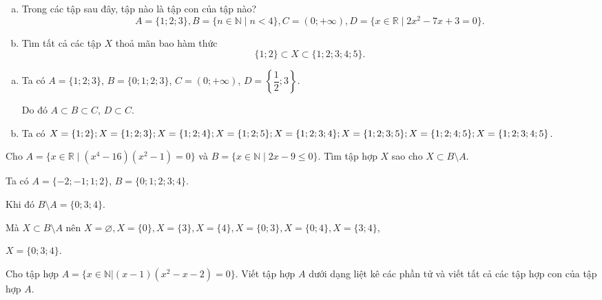 \begin{bt}%
	\begin{enumerate}[a)]
		\item Trong các tập sau đây, tập nào là tập con của tập nào?
		$$ A=\{1;2;3\}, B=\{ n\in \mathbb{N} \mid n<4 \}, 
		C=(0;+\infty ), D=\{x\in \mathbb{R} \mid 2{{x}^{2}}-7x+3=0\}.$$
		\item Tìm tất cả các tập $X$ thoả mãn bao hàm thức $$\{1;2\} \subset X \subset \{1;2;3;4;5\}.$$
	\end{enumerate}
	\loigiai
	{ \begin{enumerate}[a)]
			\item Ta có $A=\{1;2;3\}$, $B=\{0;1;2;3\}$, 
			$C=\left( 0;+\infty \right)$, $D=\left \{ \dfrac{1}{2};3 \right\}$.
			
			Do đó $A \subset B \subset C$, $D \subset C$.	
			\item Ta có $X=\{1;2\};X=\{1;2;3\}; X=\{1;2;4\}; X=\{1;2;5\};X=\{1;2;3;4\};X=\{1;2;3;5\};\\X=\{1;2;4;5\}; X=\{1;2;3;4;5\}$.
		\end{enumerate}
	}
\end{bt}

\begin{bt}%
	Cho $A=\{x\in \mathbb{R} \mid ({{x}^{4}}-16)({{x}^{2}}-1)=0\}$ và $B=\{x\in \mathbb{N} \mid 2x-9\le 0\}$. 
	Tìm tập hợp  $X$ sao cho $X \subset B \setminus  A$. 
	\loigiai
	{ 
		
		Ta có $A=\{-2;-1;1;2\}$, $B=\{0;1;2;3;4\}$.
		
		Khi đó $B \setminus  A= \{0;3;4\}$.
		
		Mà $X \subset B \setminus  A$ nên $ X= \varnothing , X=\{0\}, X=\{3\}, X=\{4\},  X=\{0; 3\},  X=\{0; 4\}, X=\{3; 4\}$,
		
		$X=\{0; 3; 4\}$. 
	}
\end{bt}

\begin{bt}%
	Cho tập hợp $A=\{x\in \mathbb{N}\Big|(x-1)(x^2-x-2)=0\}$. Viết tập hợp $A$ dưới dạng liệt kê các phần tử và viết tất cả các tập hợp con của tập hợp $A$.
\end{bt}

